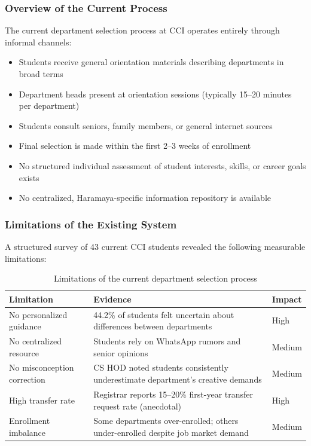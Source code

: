 ﻿\documentclass[12pt, a4paper]{article}
\newcommand{\theadrow}{\rowcolor{tableheader}}
\newcommand{\rowalt}{\rowcolor{tablerowalt}}
\begin{document}
\subsubsection*{Overview of the Current Process}

The current department selection process at CCI operates entirely through informal channels:

\begin{itemize}[leftmargin=1.5em, itemsep=3pt]
    \item Students receive general orientation materials describing departments in broad terms
    \item Department heads present at orientation sessions (typically 15--20 minutes per department)
    \item Students consult seniors, family members, or general internet sources
    \item Final selection is made within the first 2--3 weeks of enrollment
    \item No structured individual assessment of student interests, skills, or career goals exists
    \item No centralized, Haramaya-specific information repository is available
\end{itemize}

\subsubsection*{Limitations of the Existing System}

A structured survey of 43 current CCI students revealed the following measurable limitations:

\begin{table}[H]
\centering
\begin{tabularx}{\textwidth}{p{4cm}Xp{2cm}}
\toprule
\theadrow
\textbf{Limitation} & \textbf{Evidence} & \textbf{Impact} \\
\midrule
No personalized guidance & 44.2\% of students felt uncertain about differences between departments & High \\[4pt]
\rowalt
No centralized resource & Students rely on WhatsApp rumors and senior opinions & Medium \\[4pt]
No misconception correction & CS HOD noted students consistently underestimate department's creative demands & Medium \\[4pt]
\rowalt
High transfer rate & Registrar reports 15--20\% first-year transfer request rate (anecdotal) & High \\[4pt]
Enrollment imbalance & Some departments over-enrolled; others under-enrolled despite job market demand & Medium \\
\bottomrule
\end{tabularx}
\caption{Limitations of the current department selection process}
\end{table}
\end{document}
